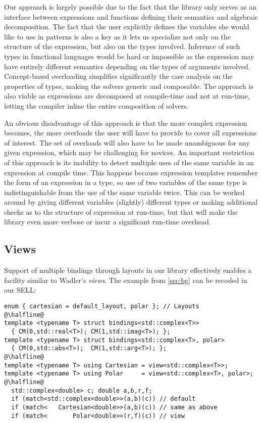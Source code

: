 Our approach is largely possible due to the fact that the library only serves as 
an interface between expressions and functions defining their semantics and 
algebraic decomposition. The fact that the user explicitly defines the variables 
she would like to use in patterns is also a key as it lets us specialize not 
only on the structure of the expression, but also on the types involved. 
Inference of such types in functional languages would be hard or impossible as the 
expression may have entirely different semantics depending on the types of 
arguments involved. Concept-based overloading simplifies significantly the case 
analysis on the properties of types, making the solvers generic and composable.
The approach is also viable as expressions are decomposed at compile-time and 
not at run-time, letting the compiler inline the entire composition of solvers. 

An obvious disadvantage of this approach is that the more complex expression 
becomes, the more overloads the user will have to provide to cover all 
expressions of interest. The set of overloads will also have to be made 
unambiguous for any given expression, which may be challenging for novices. An 
important restriction of this approach is its inability to detect multiple uses 
of the same variable in an expression at compile time. This happens because 
expression templates remember the form of an expression in a type, so use of two 
variables of the same type is indistinguishable from the use of the same 
variable twice. This can be worked around by giving different variables 
(slightly) different types or making additional checks as to the structure of 
expression at run-time, but that will make the library even more verbose or 
incur a significant run-time overhead.

\subsection{Views}
\label{sec:view}

Support of multiple bindings through layouts in our library effectively enables 
a facility similar to Wadler's \emph{views}\cite{Wadler87}. The example from 
\textsection\ref{sec:bg} can be recoded in our SELL:

\begin{lstlisting}[keepspaces,columns=flexible]
enum { cartesian = default_layout, polar }; // Layouts
@\halfline@
template <typename T> struct bindings<std::complex<T>>
  { CM(0,std::real<T>); CM(1,std::imag<T>); };
template <typename T> struct bindings<std::complex<T>, polar>
  { CM(0,std::abs<T>);  CM(1,std::arg<T>); };
@\halfline@
template <typename T> using Cartesian = view<std::complex<T>>;
template <typename T> using Polar     = view<std::complex<T>, polar>;
@\halfline@
  std::complex<double> c; double a,b,r,f;
  if (match<std::complex<double>>(a,b)(c)) // default
  if (match<   Cartesian<double>>(a,b)(c)) // same as above
  if (match<       Polar<double>>(r,f)(c)) // view
\end{lstlisting}

